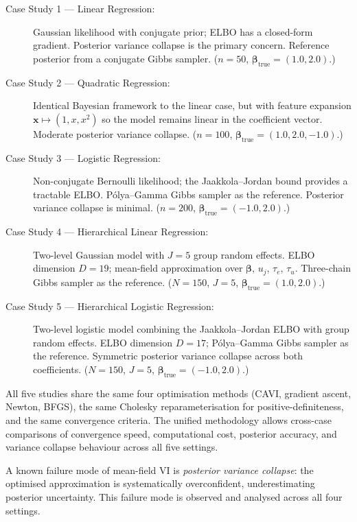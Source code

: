 \documentclass[11pt,a4paper]{article}
\begin{document}
\begin{description}
  \item[Case Study 1 --- Linear Regression:]
    Gaussian likelihood with conjugate prior; ELBO has a closed-form gradient.
    Posterior variance collapse is the primary concern.
    Reference posterior from a conjugate Gibbs sampler.
    ($n=50$, $\bm{\beta}_{\mathrm{true}} = (1.0, 2.0)$.)
  \item[Case Study 2 --- Quadratic Regression:]
    Identical Bayesian framework to the linear case, but with feature expansion
    $\bm{x} \mapsto (1, x, x^2)$ so the model remains linear in the coefficient vector.
    Moderate posterior variance collapse.
    ($n=100$, $\bm{\beta}_{\mathrm{true}} = (1.0, 2.0, -1.0)$.)
  \item[Case Study 3 --- Logistic Regression:]
    Non-conjugate Bernoulli likelihood; the Jaakkola--Jordan bound provides a tractable
    ELBO.
    P\'{o}lya--Gamma Gibbs sampler as the reference.
    Posterior variance collapse is minimal.
    ($n=200$, $\bm{\beta}_{\mathrm{true}} = (-1.0, 2.0)$.)
  \item[Case Study 4 --- Hierarchical Linear Regression:]
    Two-level Gaussian model with $J=5$ group random effects.
    ELBO dimension $D=19$; mean-field approximation over $\bm{\beta}$, $u_j$, $\tau_e$, $\tau_u$.
    Three-chain Gibbs sampler as the reference.
    ($N=150$, $J=5$, $\bm{\beta}_{\mathrm{true}} = (1.0, 2.0)$.)
  \item[Case Study 5 --- Hierarchical Logistic Regression:]
    Two-level logistic model combining the Jaakkola--Jordan ELBO with group random effects.
    ELBO dimension $D=17$; P\'{o}lya--Gamma Gibbs sampler as the reference.
    Symmetric posterior variance collapse across both coefficients.
    ($N=150$, $J=5$, $\bm{\beta}_{\mathrm{true}} = (-1.0, 2.0)$.)
\end{description}

All five studies share the same four optimisation methods (CAVI, gradient ascent,
Newton, BFGS), the same Cholesky reparameterisation for positive-definiteness, and
the same convergence criteria.
The unified methodology allows cross-case comparisons of convergence speed,
computational cost, posterior accuracy, and variance collapse behaviour across
all five settings.

A known failure mode of mean-field VI is \emph{posterior variance collapse}: the
optimised approximation is systematically overconfident, underestimating posterior
uncertainty.
This failure mode is observed and analysed across all four settings.
\end{document}

